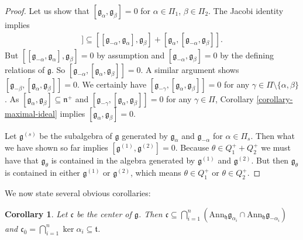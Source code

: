\documentclass[12pt, a4paper, reqno]{amsart}
\def\ol{\overline}
\newtheorem{corollary}{Corollary}
\theoremstyle{definition}
\theoremstyle{definition}
\theoremstyle{definition}
\numberwithin{theorem}{section}
\numberwithin{lemma}{section}
\numberwithin{remark}{section}
\numberwithin{definition}{section}
\numberwithin{corollary}{section}
\numberwithin{proposition}{section}
\numberwithin{example}{section}
\begin{document}
\begin{proof}
	Let us show that \([\mathfrak{g}_{\alpha},\mathfrak{g}_{\beta}] = 0\) for \(\alpha \in \Pi_1\), \(\beta \in \Pi_2\). The Jacobi identity implies
	\begin{align*}
		[\mathfrak{g}_{-\alpha},[\mathfrak{g}_{\alpha},\mathfrak{g}_{\beta}]] \subseteq [[\mathfrak{g}_{-\alpha},\mathfrak{g}_{\alpha}],\mathfrak{g}_{\beta}] + [\mathfrak{g}_{\alpha},[\mathfrak{g}_{-\alpha},\mathfrak{g}_{\beta}]].
	\end{align*}
	But \([[\mathfrak{g}_{-\alpha},\mathfrak{g}_{\alpha}],\mathfrak{g}_{\beta}] = 0\) by assumption and \([\mathfrak{g}_{-\alpha},\mathfrak{g}_{\beta}]=0\) by the defining relations of \(\mathfrak{g}\). So \([\mathfrak{g}_{-\alpha},[\mathfrak{g}_{\alpha},\mathfrak{g}_{\beta}]] = 0\). A similar argument shows \([\mathfrak{g}_{-\beta},[\mathfrak{g}_{\alpha},\mathfrak{g}_{\beta}]] = 0\). We certainly have \([\mathfrak{g}_{-\gamma},[\mathfrak{g}_{\alpha},\mathfrak{g}_{\beta}]] = 0\) for any \(\gamma \in \Pi \setminus \{\alpha,\beta\}\). As \([\mathfrak{g}_{\alpha},\mathfrak{g}_{\beta}] \subseteq \mathfrak{n}^+\) and \([\mathfrak{g}_{-\gamma},[\mathfrak{g}_{\alpha},\mathfrak{g}_{\beta}]]=0\) for any \(\gamma \in \Pi\), Corollary \ref{corollary-maximal-ideal} implies \([\mathfrak{g}_{\alpha},\mathfrak{g}_{\beta}] = 0\). \par
	Let \(\mathfrak{g}^{(s)}\) be the subalgebra of \(\mathfrak{g}\) generated by \(\mathfrak{g}_{\alpha}\) and \(\mathfrak{g}_{-\alpha}\) for \(\alpha \in \Pi_{s}\). Then what we have shown so far implies \([\mathfrak{g}^{(1)},\mathfrak{g}^{(2)}] = 0\). Because \(\theta \in Q^+_1 + Q^+_2\) we must have that \(\mathfrak{g}_{\theta}\) is contained in the algebra generated by \(\mathfrak{g}^{(1)}\) and \(\mathfrak{g}^{(2)}\). But then \(\mathfrak{g}_{\theta}\) is contained in either \(\mathfrak{g}^{(1)}\) or \(\mathfrak{g}^{(2)}\), which means \(\theta \in Q^+_1\) or \(\theta \in Q^+_2\).
\end{proof}

	We now state several obvious corollaries:
	
	\begin{corollary}\label{corollary-center}
		Let \(\mathfrak{c}\) be the center of \(\mathfrak{g}\). Then \(\mathfrak{c} \subseteq \bigcap_{i=1}^n (\mathrm{Ann}_{\mathfrak{h}} \mathfrak{g}_{\alpha_i}\cap \mathrm{Ann}_{\mathfrak{h}} \mathfrak{g}_{-\alpha_i})\) and \newline \(\mathfrak{c}_{\ol{0}} = \bigcap_{i=1}^n \ker \alpha_i \subseteq \mathfrak{t}\).
	\end{corollary}
	
\end{document}
